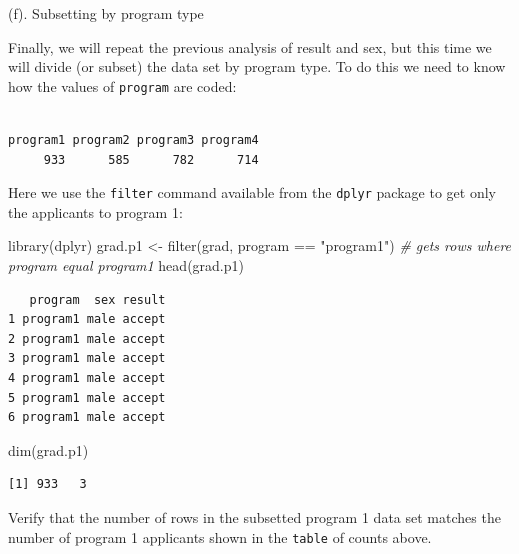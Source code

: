 \documentclass[
]{book}
\newenvironment{Shaded}{\begin{snugshade}}{\end{snugshade}}
\newcommand{\CommentTok}[1]{\textcolor[rgb]{0.56,0.35,0.01}{\textit{#1}}}
\newcommand{\FunctionTok}[1]{\textcolor[rgb]{0.00,0.00,0.00}{#1}}
\newcommand{\NormalTok}[1]{#1}
\newcommand{\OtherTok}[1]{\textcolor[rgb]{0.56,0.35,0.01}{#1}}
\newcommand{\SpecialCharTok}[1]{\textcolor[rgb]{0.00,0.00,0.00}{#1}}
\newcommand{\StringTok}[1]{\textcolor[rgb]{0.31,0.60,0.02}{#1}}
\begin{document}
(f). Subsetting by program type

Finally, we will repeat the previous analysis of result and sex, but this time we will divide (or subset) the data set by program type. To do this we need to know how the values of \texttt{program} are coded:

\begin{Shaded}
\end{Shaded}

\begin{verbatim}

program1 program2 program3 program4 
     933      585      782      714 
\end{verbatim}

Here we use the \texttt{filter} command available from the \texttt{dplyr} package to get only the applicants to program 1:

\begin{Shaded}
\begin{Highlighting}[]
\FunctionTok{library}\NormalTok{(dplyr)}
\NormalTok{grad.p1 }\OtherTok{\textless{}{-}} \FunctionTok{filter}\NormalTok{(grad, program }\SpecialCharTok{==} \StringTok{"program1"}\NormalTok{)  }\CommentTok{\# gets rows where program equal program1}
\FunctionTok{head}\NormalTok{(grad.p1)}
\end{Highlighting}
\end{Shaded}

\begin{verbatim}
   program  sex result
1 program1 male accept
2 program1 male accept
3 program1 male accept
4 program1 male accept
5 program1 male accept
6 program1 male accept
\end{verbatim}

\begin{Shaded}
\begin{Highlighting}[]
\FunctionTok{dim}\NormalTok{(grad.p1)}
\end{Highlighting}
\end{Shaded}

\begin{verbatim}
[1] 933   3
\end{verbatim}

Verify that the number of rows in the subsetted program 1 data set matches the number of program 1 applicants shown in the \texttt{table} of counts above.
\end{document}
